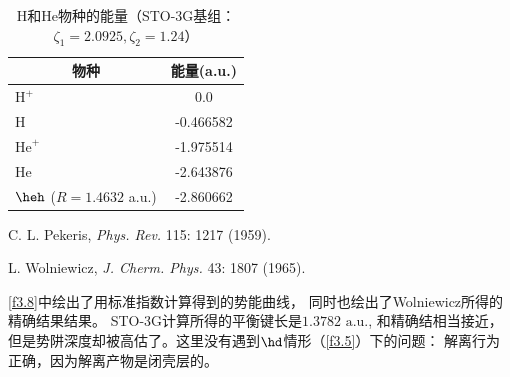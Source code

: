 \begin{table}[h]
\begin{threeparttable}
	\begin{tabular}{lc}
		\hline
		\multicolumn{1}{c}{物种} & 能量(a.u.)  \\ \hline
		$\text{H}^+$             &    0.0    \\
		$\text{H}$               & -0.466582 \\
		$\text{He}^+$            & -1.975514 \\
		$\text{He}$              & -2.643876\tnote{a} \\
		$\heh$ ($R=1.4632$ a.u.) & -2.860662\tnote{b} \\ \hline
	\end{tabular}
	\begin{tablenotes}
		\item[a] C. L. Pekeris, \textit{Phys. Rev.} 115: 1217 (1959).
		\item[b] L. Wolniewicz, \textit{J. Cherm. Phys.} 43: 1807 (1965).
	\end{tablenotes}
\end{threeparttable}
	\centering\caption{$\text{H}$和$\text{He}$物种的能量（STO-3G基组： $\zeta_1=2.0925,\zeta_2=1.24$）}
	\label{t3.6}
\end{table}
\autoref{f3.8}中绘出了用标准指数计算得到的势能曲线， 同时也绘出了Wolniewicz所得的精确结果结果。 STO-3G计算所得的平衡键长是$1.3782\,\,\text{a.u.}$, 和精确结相当接近，但是势阱深度却被高估了。这里没有遇到$\hd$情形（\autoref{f3.5}）下的问题： 解离行为正确，因为解离产物是闭壳层的。
